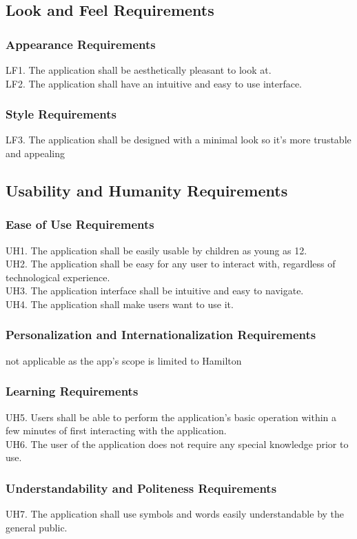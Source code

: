 \documentclass[12pt]{article}
\begin{document}
\subsection{Look and Feel Requirements}
\subsubsection{Appearance Requirements}
LF1. The application shall be aesthetically pleasant to look at.\\
LF2. The application shall have an intuitive and easy to use interface.
\subsubsection{Style Requirements}
LF3. The application shall be designed with a minimal look so it's more trustable and appealing
\subsection{Usability and Humanity Requirements}
\subsubsection{Ease of Use Requirements}
UH1.  The application shall be easily usable by children as young as 12.\\
UH2. The application shall be easy for any user to interact with, regardless of technological experience.\\
UH3. The application interface shall be intuitive and easy to navigate.\\
UH4. The application shall make users want to use it.
\subsubsection{Personalization and Internationalization Requirements}
not applicable as the app's scope is limited to Hamilton
\subsubsection{Learning Requirements}
UH5. Users shall be able to perform the application’s basic operation within a few minutes of first interacting with the application.\\
UH6. The user of the application does not require any special knowledge prior to use.
\subsubsection{Understandability and Politeness Requirements}
UH7. The application shall use symbols and words easily understandable by the general public.
\end{document}

